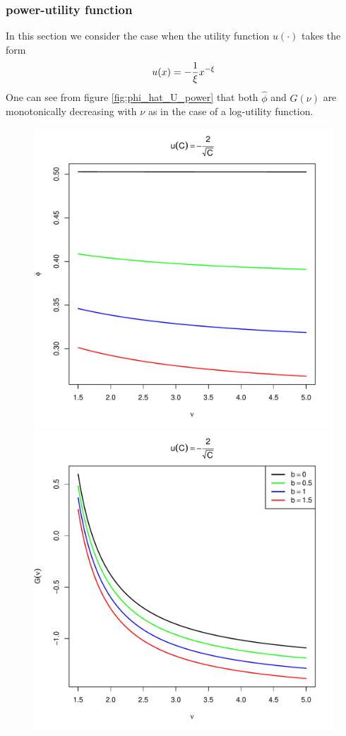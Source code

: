\documentclass[11pt,a4]{amsart}
\newcommand{\1}{{\mathbf 1}}
\begin{document}
\subsubsection{power-utility function}
In this section we consider the case when the utility function
$u(\cdot)$ takes the form
\[
u(x) = -{1 \over \xi} x^{-\xi}
\]
One can see from figure \ref{fig:phi_hat_U_power} that both $\hat
\phi$ and $G(\nu)$ are monotonically decreasing with $\nu$ as in the
case of a log-utility function.
\begin{figure}[htb!]
  \begin{minipage}{0.5\linewidth}
    \includegraphics[width=\textwidth]{phi_hat_b_t_power.pdf}
  \end{minipage}\hfill
  \begin{minipage}{0.5\linewidth}
    \includegraphics[width=\textwidth]{U_b_t_power.pdf}

\end{minipage}
\end{figure}
\end{document}
